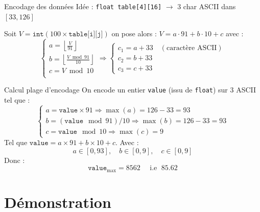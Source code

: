 \documentclass{beamer}
\begin{document}
\begin{frame}{Encodage des données}
    \centering 
    Idée : \texttt{float table[4][16]}  $\longrightarrow$ 3 char ASCII dans $[33, 126]$
    
    \raggedright

    \vspace{0.7cm}


    Soit  $ V = \texttt{int}(100 \times \texttt{table[i][j]}) $ on pose alors : 
    $ V = a \cdot 91 + b \cdot 10 + c$ avec :
        \[ 
            \begin{cases}
                a = \left\lfloor \frac{V}{91} \right\rfloor \\
                b = \left\lfloor \frac{V \bmod 91}{10} \right\rfloor \\
                c = V \bmod 10 \\
            \end{cases}
            \Longrightarrow
            \begin{cases}
                c_1 = a + 33 \quad (\text{caractère ASCII}) \\
                c_2 = b + 33 \\
                c_3 = c + 33
            \end{cases}
        \]
\end{frame}

\begin{frame}{Calcul plage d'encodage}
    On encode un entier \texttt{value} (issu de \texttt{float}) sur 3 ASCII tel que : 
    \[ 
        \begin{cases}
            a = \texttt{value} \times 91 \Longrightarrow \max(a) = 126 - 33 = 93 \\ 
            b = (\texttt{value} \mod 91) / 10 \Longrightarrow \max(b) = 126 - 33 = 93 \\ 
            c = \texttt{value} \mod 10  \Longrightarrow \max(c) = 9
        \end{cases}
    \] 
    Tel que $ \texttt{value} = a \times 91 + b \times 10 + c $. 
    Avec : 
        \[ a \in [0, 93], \quad b \in [0, 9], \quad c \in [0, 9] \] 
    Donc : 
        \[ \texttt{value}_{\text{max}} = 8562 \quad \text{ i.e } \; 85.62 \] 
    
\end{frame}


\section{Démonstration}
\end{document}
